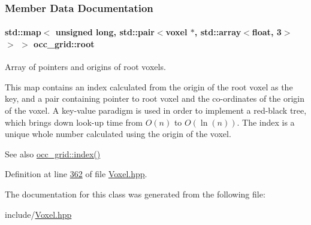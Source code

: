 \subsubsection{Member Data Documentation}
\paragraph[{\texorpdfstring{root}{root}}]{\setlength{\rightskip}{0pt plus 5cm}std\+::map$<$ unsigned long, std\+::pair$<${\bf voxel} $\ast$, std\+::array$<$float, 3$>$ $>$ $>$ occ\+\_\+grid\+::root}\hypertarget{classocc__grid_ae5ebfc317affec175dba9d27f5fcf2fa}{}\label{classocc__grid_ae5ebfc317affec175dba9d27f5fcf2fa}


Array of pointers and origins of root voxels. 

This map contains an index calculated from the origin of the root voxel as the key, and a pair containing pointer to root voxel and the co-\/ordinates of the origin of the voxel. A key-\/value paradigm is used in order to implement a red-\/black tree, which brings down look-\/up time from $O(n)$ to $O(\ln(n))$. The index is a unique whole number calculated using the origin of the voxel. \begin{DoxySeeAlso}{See also}
\hyperlink{classocc__grid_a0fb045d82217675decfc9b9289ad35ea}{occ\+\_\+grid\+::index()} 
\end{DoxySeeAlso}


Definition at line \hyperlink{Voxel_8hpp_source_l00362}{362} of file \hyperlink{Voxel_8hpp_source}{Voxel.\+hpp}.



The documentation for this class was generated from the following file\+:\begin{DoxyCompactItemize}
\item 
include/\hyperlink{Voxel_8hpp}{Voxel.\+hpp}\end{DoxyCompactItemize}
